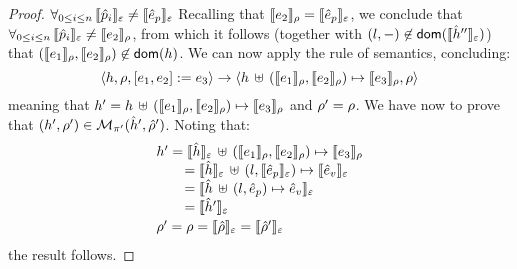 \begin{proof}
$
  \forall_{0 \leq i \leq n}  \, \symbeval{\sexprp_i}{\senv} \neq \symbeval{\sexpr_p}{\senv} 
$
Recalling that $\symbeval{\jsilexpr_2}{\store} = \symbeval{\sexpr_p}{\senv}$, we conclude that  
$
  \forall_{0 \leq i \leq n}  \, \symbeval{\sexprp_i}{\senv} \neq \symbeval{\jsilexpr_2}{\store}
$, from which it follows (together with $(\loc, -) \not\in \domain(\semexpr{\sheap''}{\senv})$) that 
$(\symbeval{\jsilexpr_1}{\store}, \symbeval{\jsilexpr_2}{\store}) \not\in \domain(\heap)$.
We can now apply the  rule of \jsil semantics, concluding: 
$$
   \semtrans{\heap, \store, [\jsilexpr_1, \jsilexpr_2] := \jsilexpr_3}
     {\heap \dunion (\symbeval{\jsilexpr_1}{\store}, \symbeval{\jsilexpr_2}{\store}) \mapsto \symbeval{\jsilexpr_3}{\store},  \store}
$$
meaning that $\heap' = \heap \dunion (\symbeval{\jsilexpr_1}{\store}, \symbeval{\jsilexpr_2}{\store}) \mapsto \symbeval{\jsilexpr_3}{\store}$ 
and $\store' = \store$. 
%
We have now to prove that $(\heap', \store') \in \smodels{\sheap', \sstore'}{\pc'}$.
Noting that:
$$
\begin{array}{l}
\heap' = \symbeval{\sheap}{\senv} \dunion (\symbeval{\jsilexpr_1}{\store}, \symbeval{\jsilexpr_2}{\store}) \mapsto \symbeval{\jsilexpr_3}{\store} \\ 
  \qquad = \symbeval{\sheap}{\senv} \dunion (\loc, \symbeval{\sexpr_p}{\senv}) \mapsto \symbeval{\sexpr_v}{\senv}  \\
    \qquad = \symbeval{\sheap \dunion (\loc, \sexpr_p) \mapsto \sexpr_v}{\senv}  \\
    \qquad = \symbeval{\sheap'}{\senv} \\[2pt]
 \store' = \store = \symbeval{\sstore}{\senv} = \symbeval{\sstore'}{\senv} 
\end{array}
$$
the result follows. 
\vspace{6pt}




\end{proof}
